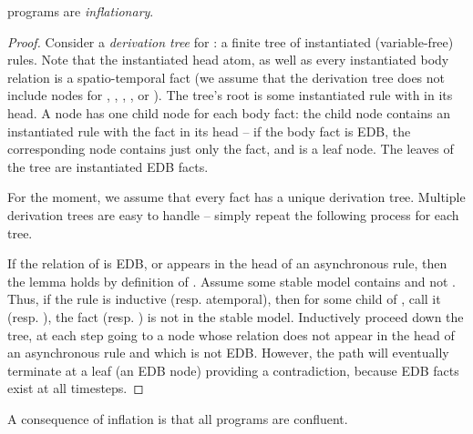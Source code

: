\begin{lemma}
\label{lem:inflationary}
\slang programs are {\em inflationary}.
\end{lemma}
\begin{proof}
Consider a {\em derivation tree} for : a finite tree of instantiated (variable-free) rules.  Note that the instantiated head atom, as well as every instantiated body relation is a spatio-temporal fact (we assume that the derivation tree does not include nodes for , , , \dedalus{<}, or ).  The tree's root is some instantiated rule with  in its head.  A node has one child node for each body fact: the child node contains an instantiated rule with the fact in its head -- if the body fact is EDB, the corresponding node contains just only the fact, and is a leaf node.  The leaves of the tree are instantiated EDB facts.

For the moment, we assume that every fact has a unique derivation tree.  Multiple derivation trees are easy to handle -- simply repeat the following process for each tree.

If the relation of  is EDB, or appears in the head of an asynchronous rule, then the lemma holds by definition of \slang.  Assume some stable model contains  and not .  Thus, if the rule is inductive (resp. atemporal), then for some child of , call it  (resp. ), the fact  (resp. ) is not in the stable model.  Inductively proceed down the tree, at each step going to a node whose relation does not appear in the head of an asynchronous rule and which is not EDB.  However, the path will eventually terminate at a leaf (an EDB node) providing a contradiction, because EDB facts exist at all timesteps.
\end{proof}

A consequence of inflation is that all \slang programs are confluent.

